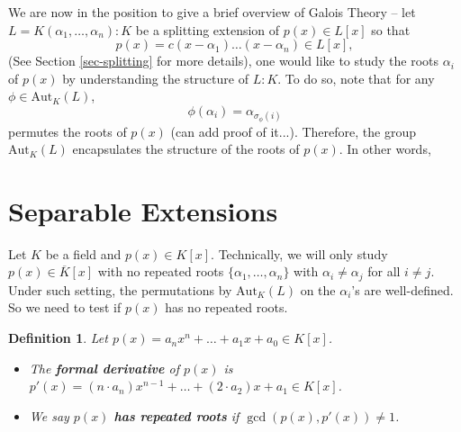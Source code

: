 \documentclass[11pt]{book}
\newtheorem{definition}[theorem]{Definition}
\begin{document}
\vspace{2mm}
We are now in the position to give a brief overview of Galois Theory -- let \(L = K(\alpha_1,\dots, \alpha_n) : K\) be a splitting extension of \(p(x) \in L[x]\) so that
\[
    p(x) = c(x - \alpha_1) \dots (x - \alpha_n) \in L[x],
\]
(See Section \ref{sec-splitting} for more details), one would like to study the roots $\alpha_i$ of $p(x)$ by understanding the structure of $L:K$. To do so, note that
for any \(\phi \in \mathrm{Aut}_K(L)\), 
$$\phi(\alpha_i) = \alpha_{\sigma_{\phi}(i)}$$
permutes the roots of $p(x)$ (can add proof of it...). Therefore, the group $\mathrm{Aut}_K(L)$ encapsulates the structure of the roots of $p(x)$. In other words,
\begin{center}
\end{center}

\section{Separable Extensions} \label{subsec-separable}
Let $K$ be a field and $p(x) \in K[x]$. Technically, we will only study $p(x) \in \overline{K}[x]$ with no repeated roots $\{\alpha_1, \dots, \alpha_n\}$ with $\alpha_i \neq \alpha_j$ for all $i \neq j$. Under such setting, the permutations by $\mathrm{Aut}_K(L)$ on the $\alpha_i$'s are well-defined.
So we need to test if $p(x)$ has no repeated roots.

\begin{definition} Let $p(x) = a_nx^n + \ldots + a_1x + a_0 \in K[x]$.
\begin{itemize}
    \item[(a)] The {\bf formal derivative} of $p(x)$ is $p'(x) = (n \cdot a_n)x^{n-1} + \dots + (2 \cdot a_2)x + a_1 \in K[x]$.
    \item[(b)] We say $p(x)$ {\bf has repeated roots} if $\gcd(p(x), p'(x)) \neq 1$.
\end{itemize}
\end{definition}
\end{document}
